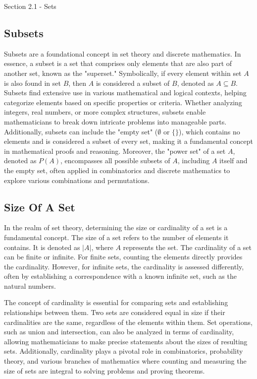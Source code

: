 \begin{notes}{Section 2.1 - Sets}
    \subsection*{Subsets}

    Subsets are a foundational concept in set theory and discrete mathematics. In essence, a subset is a set that comprises only elements that are also part of another set, known as the "superset." 
    Symbolically, if every element within set $A$ is also found in set $B$, then $A$ is considered a subset of $B$, denoted as $A \subseteq B$. Subsets find extensive use in various mathematical and 
    logical contexts, helping categorize elements based on specific properties or criteria. Whether analyzing integers, real numbers, or more complex structures, subsets enable mathematicians to 
    break down intricate problems into manageable parts. Additionally, subsets can include the "empty set" ($\emptyset$ or $\{\}$), which contains no elements and is considered a subset of every 
    set, making it a fundamental concept in mathematical proofs and reasoning. Moreover, the "power set" of a set $A$, denoted as $P(A)$, encompasses all possible subsets of $A$, including $A$ itself 
    and the empty set, often applied in combinatorics and discrete mathematics to explore various combinations and permutations.

    \subsection*{Size Of A Set}

    In the realm of set theory, determining the size or cardinality of a set is a fundamental concept. The size of a set refers to the number of elements it contains. It is denoted as $\lvert A \rvert$, 
    where $A$ represents the set. The cardinality of a set can be finite or infinite. For finite sets, counting the elements directly provides the cardinality. However, for infinite sets, the cardinality 
    is assessed differently, often by establishing a correspondence with a known infinite set, such as the natural numbers.

    The concept of cardinality is essential for comparing sets and establishing relationships between them. Two sets are considered equal in size if their cardinalities are the same, regardless of the 
    elements within them. Set operations, such as union and intersection, can also be analyzed in terms of cardinality, allowing mathematicians to make precise statements about the sizes of resulting 
    sets. Additionally, cardinality plays a pivotal role in combinatorics, probability theory, and various branches of mathematics where counting and measuring the size of sets are integral to solving 
    problems and proving theorems.


\end{notes}
